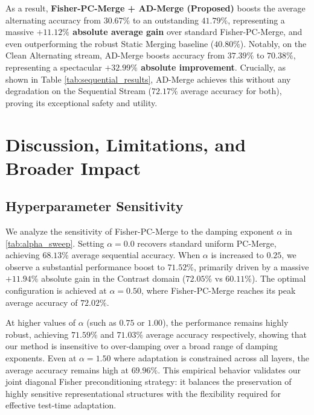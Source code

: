 \documentclass{article}
\theoremstyle{plain}
\theoremstyle{definition}
\theoremstyle{remark}
\begin{document}
As a result, \textbf{Fisher-PC-Merge + AD-Merge (Proposed)} boosts the average alternating accuracy from $30.67\%$ to an outstanding \textbf{$41.79\%$}, representing a massive \textbf{$+11.12\%$ absolute average gain} over standard Fisher-PC-Merge, and even outperforming the robust Static Merging baseline ($40.80\%$). Notably, on the Clean Alternating stream, AD-Merge boosts accuracy from $37.39\%$ to \textbf{$70.38\%$}, representing a spectacular \textbf{$+32.99\%$ absolute improvement}. Crucially, as shown in Table \ref{tab:sequential_results}, AD-Merge achieves this without any degradation on the Sequential Stream ($72.17\%$ average accuracy for both), proving its exceptional safety and utility.

\section{Discussion, Limitations, and Broader Impact}
\label{discussion}
\subsection{Hyperparameter Sensitivity}
We analyze the sensitivity of Fisher-PC-Merge to the damping exponent $\alpha$ in \cref{tab:alpha_sweep}. Setting $\alpha = 0.0$ recovers standard uniform PC-Merge, achieving $68.13\%$ average sequential accuracy. When $\alpha$ is increased to $0.25$, we observe a substantial performance boost to $71.52\%$, primarily driven by a massive $+11.94\%$ absolute gain in the Contrast domain ($72.05\%$ vs $60.11\%$). The optimal configuration is achieved at $\alpha = 0.50$, where Fisher-PC-Merge reaches its peak average accuracy of $72.02\%$. 

At higher values of $\alpha$ (such as $0.75$ or $1.00$), the performance remains highly robust, achieving $71.59\%$ and $71.03\%$ average accuracy respectively, showing that our method is insensitive to over-damping over a broad range of damping exponents. Even at $\alpha = 1.50$ where adaptation is constrained across all layers, the average accuracy remains high at $69.96\%$. This empirical behavior validates our joint diagonal Fisher preconditioning strategy: it balances the preservation of highly sensitive representational structures with the flexibility required for effective test-time adaptation.
\end{document}
